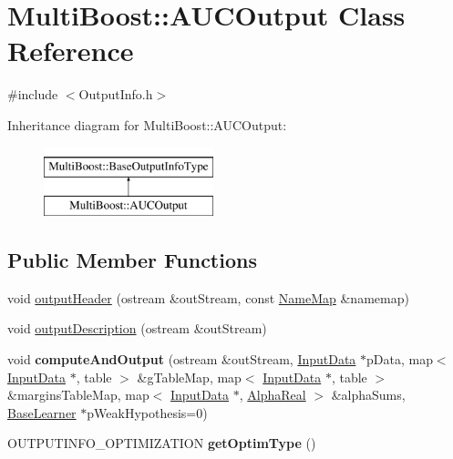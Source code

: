 \hypertarget{classMultiBoost_1_1AUCOutput}{\section{Multi\-Boost\-:\-:A\-U\-C\-Output Class Reference}
\label{classMultiBoost_1_1AUCOutput}
}


{\ttfamily \#include $<$Output\-Info.\-h$>$}

Inheritance diagram for Multi\-Boost\-:\-:A\-U\-C\-Output\-:\begin{figure}[H]
\begin{center}
\leavevmode
\includegraphics[height=2.000000cm]{classMultiBoost_1_1AUCOutput}
\end{center}
\end{figure}
\subsection*{Public Member Functions}
\begin{DoxyCompactItemize}
\item 
void \hyperlink{classMultiBoost_1_1AUCOutput_aaad068a71360d488028ba2fec82eaa97}{output\-Header} (ostream \&out\-Stream, const \hyperlink{classMultiBoost_1_1NameMap}{Name\-Map} \&namemap)
\item 
void \hyperlink{classMultiBoost_1_1AUCOutput_a3a85dceee25d28bd4604654faa92e7e4}{output\-Description} (ostream \&out\-Stream)
\item 
\hypertarget{classMultiBoost_1_1AUCOutput_af746ee2c096b9f17c3a24725a6577676}{void {\bfseries compute\-And\-Output} (ostream \&out\-Stream, \hyperlink{classMultiBoost_1_1InputData}{Input\-Data} $\ast$p\-Data, map$<$ \hyperlink{classMultiBoost_1_1InputData}{Input\-Data} $\ast$, table $>$ \&g\-Table\-Map, map$<$ \hyperlink{classMultiBoost_1_1InputData}{Input\-Data} $\ast$, table $>$ \&margins\-Table\-Map, map$<$ \hyperlink{classMultiBoost_1_1InputData}{Input\-Data} $\ast$, \hyperlink{Defaults_8h_a80184c4fd10ab70a1a17c5f97dcd1563}{Alpha\-Real} $>$ \&alpha\-Sums, \hyperlink{classMultiBoost_1_1BaseLearner}{Base\-Learner} $\ast$p\-Weak\-Hypothesis=0)}\label{classMultiBoost_1_1AUCOutput_af746ee2c096b9f17c3a24725a6577676}

\item 
\hypertarget{classMultiBoost_1_1AUCOutput_a79a5bb123b05cd225b685558fe15a78b}{O\-U\-T\-P\-U\-T\-I\-N\-F\-O\-\_\-\-O\-P\-T\-I\-M\-I\-Z\-A\-T\-I\-O\-N {\bfseries get\-Optim\-Type} ()}\label{classMultiBoost_1_1AUCOutput_a79a5bb123b05cd225b685558fe15a78b}

\end{DoxyCompactItemize}
